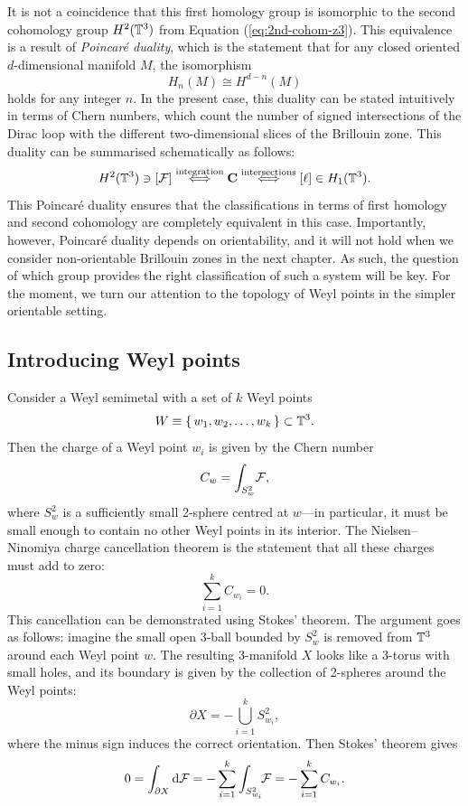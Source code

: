 It is not a coincidence that this first homology group is isomorphic to the second cohomology group $H^2(\mathbb{T}^3)$ from Equation (\ref{eq:2nd-cohom-z3}). This equivalence is a result of \emph{Poincaré duality}, which is the statement that for any closed oriented $d$-dimensional manifold $M$, the isomorphism
\[
	H_n(M) \cong H^{d-n}(M)
\]
holds for any integer $n$. In the present case, this duality can be stated intuitively in terms of Chern numbers, which count the number of signed intersections of the Dirac loop with the different two-dimensional slices of the Brillouin zone. This duality can be summarised schematically as follows:
\[
	H^2(\mathbb{T}^3) \ni [\mathcal{F}] \overset{\rm integration}{\iff} \vb{C} \overset{\rm intersections}{\iff} [\ell] \in H_1(\mathbb{T}^3).
\]
This Poincaré duality ensures that the classifications in terms of first homology and second cohomology are completely equivalent in this case. Importantly, however, Poincaré duality depends on orientability, and it will not hold when we consider non-orientable Brillouin zones in the next chapter. As such, the question of which group provides the right classification of such a system will be key. For the moment, we turn our attention to the topology of Weyl points in the simpler orientable setting.


\subsection{Introducing Weyl points}

Consider a Weyl semimetal with a set of $k$ Weyl points
\[
	W \equiv \set{w_1,w_2,\ldots,w_k}\subset \mathbb{T}^3.
\]
Then the charge of a Weyl point $w_i$ is given by the Chern number
\begin{equation}
	C_w = \int_{S_w^2}\!\mathcal{F},
\end{equation}
where $S_w^2$ is a sufficiently small 2-sphere centred at $w$---in particular, it must be small enough to contain no other Weyl points in its interior. The Nielsen--Ninomiya charge cancellation theorem is the statement that all these charges must add to zero:
\begin{equation}
	\sum_{i=1}^{k}C_{w_i} = 0.
\end{equation}
This cancellation can be demonstrated using Stokes' theorem. The argument goes as follows: imagine the small open 3-ball bounded by $S_w^2$ is removed from $\mathbb{T}^3$ around each Weyl point $w$. The resulting 3-manifold $X$ looks like a 3-torus with small holes, and its boundary is given by the collection of 2-spheres around the Weyl points:
\[
	\partial X = -\bigcup_{i=1}^k S_{w_i}^2,
\]
where the minus sign induces the correct orientation. Then Stokes' theorem gives
\[
	0 = \int_{\partial X} \dd{\mathcal{F}} = -\sum_{i=1}^{k}\int_{S_{w_i}^2}\!\!\mathcal{F} = -\sum_{i=1}^{k}C_{w_i}.
\]

